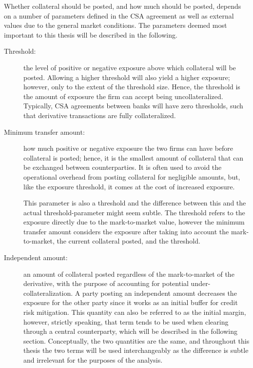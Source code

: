 \documentclass[main.tex]{subfiles}
\begin{document}
        Whether collateral should be posted, and how much should be posted, 
        depends on a number of parameters defined in the CSA agreement
        as well as external values due to the general market conditions.
        The parameters deemed most important to this thesis will be described in the following.
        \begin{description}
            \item[Threshold:] 
            the level of positive or negative exposure above which collateral will be posted. 
            Allowing a higher threshold will also yield a higher exposure;
            however, only to the extent of the threshold size. 
            Hence, the threshold is the amount of exposure the firm can accept being uncollateralized.
            Typically, CSA agreements between banks will have zero thresholds, 
            such that derivative transactions are fully collateralized.
            
            \item[Minimum transfer amount:] 
            how much positive or negative exposure the two firms can have before collateral is posted;
            hence, it is the smallest amount of collateral that can be exchanged between counterparties.
            It is often used to avoid the operational overhead from posting collateral for negligible amounts,
            but, like the exposure threshold, it comes at the cost of increased exposure.

            This parameter is also a threshold and the difference between this
            and the actual threshold-parameter might seem subtle.
            The threshold refers to the exposure directly due to the mark-to-market value,
            however the minimum transfer amount considers the exposure after taking into 
            account the mark-to-market, the current collateral posted, and the threshold.

            \item[Independent amount:]
            an amount of collateral posted regardless of the mark-to-market 
            of the derivative, with the purpose of accounting for potential under-collateralization.
            A party posting an independent amount decreases the exposure for the other party
            since it works as an initial buffer for credit risk mitigation.
            This quantity can also be referred to as the initial margin, however, strictly speaking, 
            that term tends to be used when clearing through a central counterparty,
            which will be described in the following section.
            Conceptually, the two quantities are the same, and throughout this thesis
            the two terms will be used interchangeably as the difference is subtle
            and irrelevant for the purposes of the analysis. 


\end{description}
\end{document}
